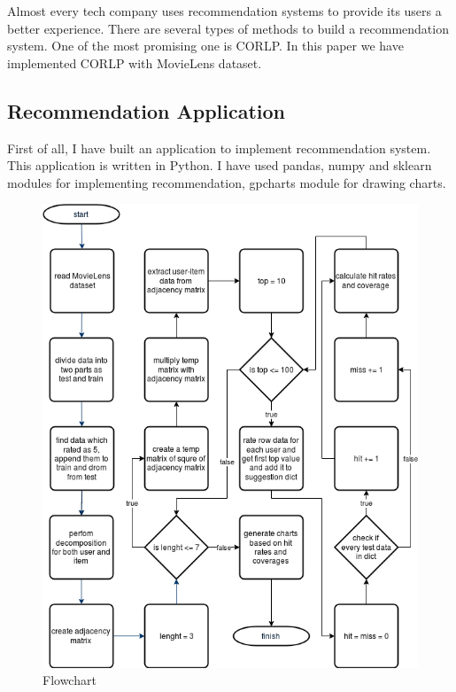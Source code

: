 Almost every tech company uses recommendation systems to provide its users a better experience. There are several types of methods to build a recommendation system. One of the most promising one is \ac{CORLP}. In this paper we have implemented \ac{CORLP} with MovieLens dataset.

\subsection{Recommendation Application}
First of all, I have built an application to implement recommendation system. This application is written in Python. I have used pandas, numpy and sklearn modules for implementing recommendation, gpcharts module for drawing charts.

\begin{figure}[h!]
   \centering
   \includegraphics[width=1\linewidth]{images/flowchart.png}
   \caption{Flowchart}
   \label{fig:flowchart}
\end{figure}

